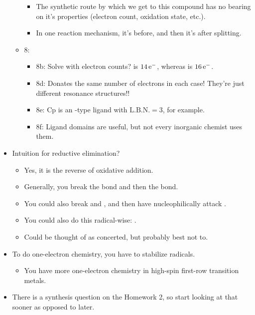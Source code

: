 \documentclass[../notes.tex]{subfiles}
\begin{document}
\begin{itemize}
\begin{itemize}
\begin{itemize}
            \item The synthetic route by which we get to this compound has no bearing on it's properties (electron count, oxidation state, etc.).
            \item In one reaction mechanism, it's  before, and then it's  after splitting.
        \end{itemize}
        \item 8:
        \begin{itemize}
            \item 8b: Solve with electron counts?  is $14\,\e[-]$, whereas  is $16\,\e[-]$.
            \item 8d: Donates the same number of electrons in each case! They're just different resonance structures!!
            \item 8e: Cp is an -type ligand with $\text{L.B.N.}=3$, for example.
            \item 8f: Ligand domains are useful, but not every inorganic chemist uses them.
        \end{itemize}
    \end{itemize}
    \item Intuition for reductive elimination?
    \begin{itemize}
        \item Yes, it is the reverse of oxidative addition.
        \item Generally, you break the  bond and then the  bond.
        \item You could also break  and , and then have  nucleophilically attack \ce{[M-A]+}.
        \item You could also do this radical-wise: .
        \item Could be thought of as concerted, but probably best not to.
    \end{itemize}
    \item To do one-electron chemistry, you have to stabilize radicals.
    \begin{itemize}
        \item You have more one-electron chemistry in high-spin first-row transition metals.
    \end{itemize}
    \item There is a synthesis question on the Homework 2, so start looking at that sooner as opposed to later.
\end{itemize}
\end{document}
